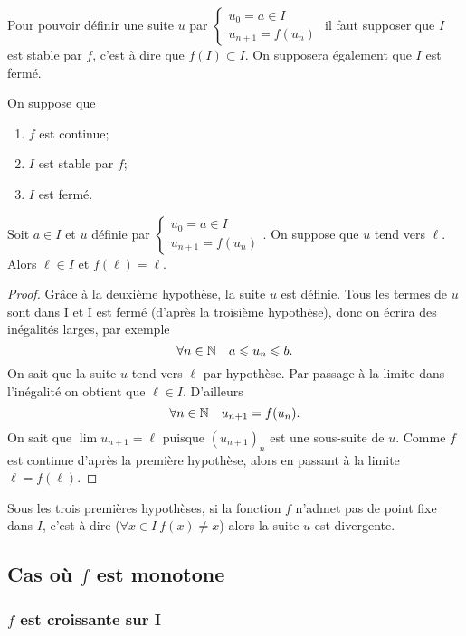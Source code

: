 Pour pouvoir définir une suite $u$ par $\begin{cases} u_0=a \in I \\ u_{n+1}=f(u_n) \end{cases}$ il faut supposer que $I$ est stable par $f$, c'est à dire que $f(I) \subset I$. On supposera également que $I$ est fermé.

\begin{prop}
  On suppose que 
  \begin{enumerate}
  \item $f$ est continue;
  \item $I$ est stable par $f$;
  \item $I$ est fermé.
  \end{enumerate}
  Soit $a \in I$ et $u$ définie par $\begin{cases} u_0=a \in I \\ u_{n+1}=f(u_n) \end{cases}$. On suppose que $u$ tend vers $\ell$. Alors $\ell \in I$ et $f(\ell)=\ell$.
\end{prop}
\begin{proof}
  Grâce à la deuxième hypothèse, la suite $u$ est définie. Tous les termes de $u$ sont dans I et I est fermé (d'après la troisième hypothèse), donc on écrira des inégalités larges, par exemple
  \begin{equation}
    \forall n \in \mathbb{N} \quad a \leqslant u_n \leqslant b.
  \end{equation}
  On sait que la suite $u$ tend vers $\ell$ par hypothèse. Par passage à la limite dans l'inégalité on obtient que $\ell \in I$. D'ailleurs
  \begin{equation}
    \forall n \in \mathbb{N} \quad u_{n+1}=f(u_n).
  \end{equation}
  On sait que $\lim u_{n+1}=\ell$ puisque $(u_{n+1})_n$ est une sous-suite de $u$. Comme $f$ est continue d'après la première hypothèse, alors en passant à la limite $\ell=f(\ell)$.
\end{proof}

Sous les trois premières hypothèses, si la fonction $f$ n'admet pas de point fixe dans $I$, c'est à dire ($\forall x \in I \ f(x) \neq x$) alors la suite $u$ est divergente.

\subsection{Cas où $f$ est monotone}

\subsubsection{$f$ est croissante sur I}

